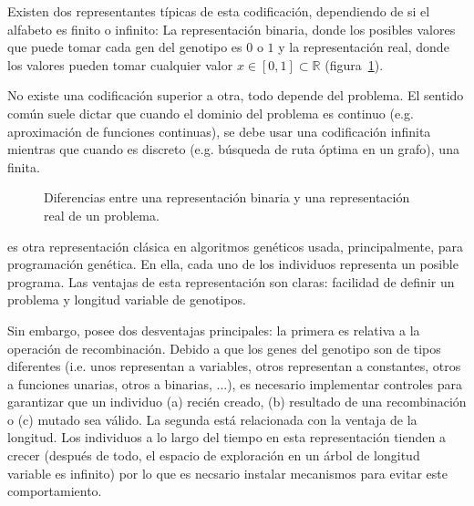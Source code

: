 Existen dos representantes típicas de esta codificación, dependiendo de si el alfabeto es finito o infinito: La representación binaria, donde los posibles valores que puede tomar cada gen del genotipo es $0$ o $1$ y la representación real, donde los valores pueden tomar cualquier valor $x \in [0, 1] \subset \mathbb{R}$ (figura~\ref{fig:bin-vs-real-ŕepresentation}).

No existe una codificación superior a otra, todo depende del problema. El sentido común suele dictar que cuando el dominio del problema es continuo (e.g. aproximación de funciones continuas), se debe usar una codificación infinita mientras que cuando es discreto (e.g. búsqueda de ruta óptima en un grafo), una finita.

\begin{figure}[t]
	\caption[Diferencias entre representación de un genotipo como cadena binaria y como cadena real]{Diferencias entre una representación binaria y una representación real de un problema.}
	\label{fig:bin-vs-real-ŕepresentation}
\end{figure}

 es otra representación clásica en algoritmos genéticos usada, principalmente, para programación genética. En ella, cada uno de los individuos representa un posible programa. Las ventajas de esta representación son claras: facilidad de definir un problema y longitud variable de genotipos.

Sin embargo, posee dos desventajas principales: la primera es relativa a la operación de recombinación. Debido a que los genes del genotipo son de tipos diferentes (i.e. unos representan a variables, otros representan a constantes, otros a funciones unarias, otros a binarias, ...), es necesario implementar controles para garantizar que un individuo (a) recién creado, (b) resultado de una recombinación o (c) mutado sea válido. La segunda está relacionada con la ventaja de la longitud. Los individuos a lo largo del tiempo en esta representación tienden a crecer (después de todo, el espacio de exploración en un árbol de longitud variable es infinito) por lo que es necsario instalar mecanismos para evitar este comportamiento.

